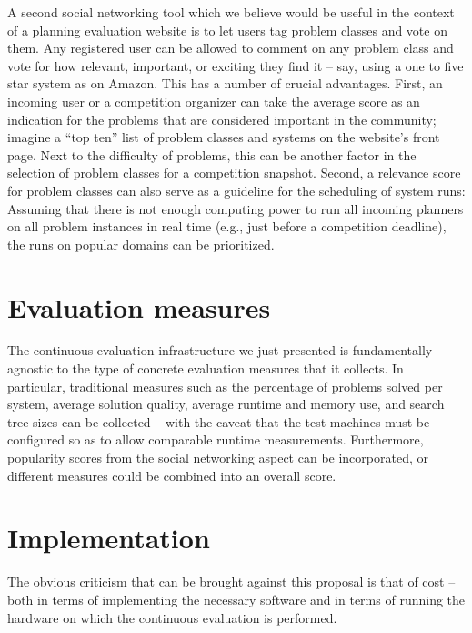A second social networking tool which we believe would be useful in
the context of a planning evaluation website is to let users tag
problem classes and vote on them.  Any registered user can be allowed
to comment on any problem class and vote for how relevant, important,
or exciting they find it -- say, using a one to five star system as on
Amazon.  This has a number of crucial advantages.  First, an incoming
user or a competition organizer can take the average score as an
indication for the problems that are considered important in the
community; imagine a ``top ten'' list of problem classes and systems
on the website's front page.  Next to the difficulty of problems, this
can be another factor in the selection of problem classes for a
competition snapshot.  Second, a relevance score for problem classes
can also serve as a guideline for the scheduling of system runs:
Assuming that there is not enough computing power to run all incoming
planners on all problem instances in real time (e.g., just before a
competition deadline), the runs on popular domains can be prioritized.






\section{Evaluation measures}

The continuous evaluation infrastructure we just presented is
fundamentally agnostic to the type of concrete evaluation measures
that it collects.  In particular, traditional measures such as the
percentage of problems solved per system, average solution quality,
average runtime and memory use, and search tree sizes can be collected
-- with the caveat that the test machines must be configured so as to
allow comparable runtime measurements.  Furthermore, popularity scores
from the social networking aspect can be incorporated, or different
measures could be combined into an overall score.



\section{Implementation}

The obvious criticism that can be brought against this proposal is
that of cost -- both in terms of implementing the necessary software
and in terms of running the hardware on which the continuous
evaluation is performed.

